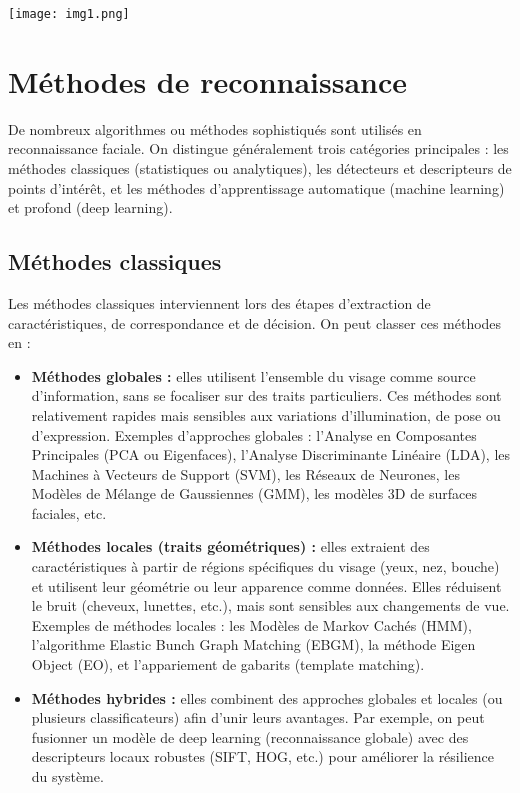 \documentclass[11pt,a4paper]{article}
\begin{document}
	\texttt{[image: img1.png]}
	
	\section{ Méthodes de reconnaissance}
	\vspace{0.5cm}
	De nombreux algorithmes ou méthodes sophistiqués sont utilisés en reconnaissance faciale. On distingue généralement trois catégories principales : les méthodes classiques (statistiques ou analytiques), les détecteurs et descripteurs de points d’intérêt, et les méthodes d’apprentissage automatique (machine learning) et profond (deep learning). 
	\vspace{0.5cm}
	\subsection{Méthodes classiques}
	Les méthodes classiques interviennent lors des étapes d’extraction de caractéristiques, de correspondance et de décision. On peut classer ces méthodes en :
	\begin{itemize}
		\item \textbf{Méthodes globales :} elles utilisent l’ensemble du visage comme source d’information, sans se focaliser sur des traits particuliers. Ces méthodes sont relativement rapides mais sensibles aux variations d’illumination, de pose ou d’expression. Exemples d’approches globales : l’Analyse en Composantes Principales (PCA ou Eigenfaces), l’Analyse Discriminante Linéaire (LDA), les Machines à Vecteurs de Support (SVM), les Réseaux de Neurones, les Modèles de Mélange de Gaussiennes (GMM), les modèles 3D de surfaces faciales, etc.
		\item \textbf{Méthodes locales (traits géométriques) :} elles extraient des caractéristiques à partir de régions spécifiques du visage (yeux, nez, bouche) et utilisent leur géométrie ou leur apparence comme données. Elles réduisent le bruit (cheveux, lunettes, etc.), mais sont sensibles aux changements de vue. Exemples de méthodes locales : les Modèles de Markov Cachés (HMM), l’algorithme Elastic Bunch Graph Matching (EBGM), la méthode Eigen Object (EO), et l’appariement de gabarits (template matching).
		\item \textbf{Méthodes hybrides :} elles combinent des approches globales et locales (ou plusieurs classificateurs) afin d’unir leurs avantages. Par exemple, on peut fusionner un modèle de deep learning (reconnaissance globale) avec des descripteurs locaux robustes (SIFT, HOG, etc.) pour améliorer la résilience du système.
	\end{itemize}
	\vspace{0.5cm}
\end{document}
